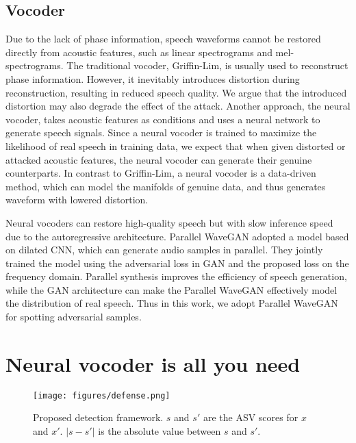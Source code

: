 \subsection{Vocoder}
Due to the lack of phase information, speech waveforms cannot be restored directly from acoustic features, such as linear spectrograms and mel-spectrograms.
The traditional vocoder, Griffin-Lim, \cite{griffin1984signal} is usually used to reconstruct phase information.
However, it inevitably introduces distortion during reconstruction, resulting in reduced speech quality.
We argue that the introduced distortion may also degrade the effect of the attack.
Another approach, the neural vocoder, takes acoustic features as conditions and uses a neural network to generate speech signals.
Since a neural vocoder is trained to maximize the likelihood of real speech in training data, we expect that when given distorted or attacked acoustic features, the neural vocoder can generate their genuine counterparts. 
In contrast to Griffin-Lim, a neural vocoder is a data-driven method, which can model the manifolds of genuine data, and thus generates waveform with lowered distortion. %

Neural vocoders can restore high-quality speech but with slow inference speed due to the autoregressive architecture.
Parallel WaveGAN \cite{yamamoto2020parallel} adopted a model based on dilated CNN, which can generate audio samples in parallel.
They jointly trained the model using the adversarial loss in GAN and the proposed loss on the frequency domain.
Parallel synthesis improves the efficiency of speech generation, while the GAN architecture can make the Parallel WaveGAN effectively model the distribution of real speech.
Thus in this work, we adopt Parallel WaveGAN for spotting adversarial samples.



\section{Neural vocoder is all you need}
\label{sec:method}
\begin{figure}[ht]
  \centering
  \centerline{\texttt{[image: figures/defense.png]}}
  \vspace{-5pt}
  \caption{Proposed detection framework. $s$ and $s'$ are the ASV scores for $x$ and $x'$. $|s-s'|$ is the absolute value between $s$ and $s'$.}
  \label{fig:method}
  \vspace{-5pt}
\end{figure}

